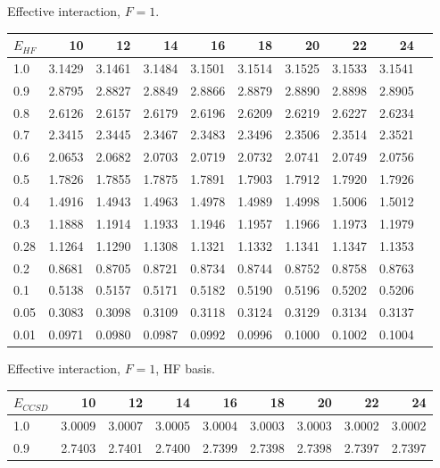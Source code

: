  
\begin{landscape}
\begin{table}
\begin{center}
Effective interaction, $F=1$.\\
\begin{tabular}{l|rrrrrrrrr}
\hline 
$E_{HF}$ & 10 & 12 & 14 & 16 & 18 & 20 & 22 & 24\\ 
\hline \hline
1.0 & 3.1429 & 3.1461 & 3.1484 & 3.1501 & 3.1514 & 3.1525 & 3.1533 & 3.1541  \\ 
0.9 & 2.8795 & 2.8827 & 2.8849 & 2.8866 & 2.8879 & 2.8890 & 2.8898 & 2.8905  \\ 
0.8 & 2.6126 & 2.6157 & 2.6179 & 2.6196 & 2.6209 & 2.6219 & 2.6227 & 2.6234  \\ 
0.7 & 2.3415 & 2.3445 & 2.3467 & 2.3483 & 2.3496 & 2.3506 & 2.3514 & 2.3521  \\ 
0.6 & 2.0653 & 2.0682 & 2.0703 & 2.0719 & 2.0732 & 2.0741 & 2.0749 & 2.0756  \\ 
0.5 & 1.7826 & 1.7855 & 1.7875 & 1.7891 & 1.7903 & 1.7912 & 1.7920 & 1.7926  \\ 
0.4 & 1.4916 & 1.4943 & 1.4963 & 1.4978 & 1.4989 & 1.4998 & 1.5006 & 1.5012  \\ 
0.3 & 1.1888 & 1.1914 & 1.1933 & 1.1946 & 1.1957 & 1.1966 & 1.1973 & 1.1979  \\ 
0.28 & 1.1264 & 1.1290 & 1.1308 & 1.1321 & 1.1332 & 1.1341 & 1.1347 & 1.1353 \\ 
0.2 & 0.8681 & 0.8705 & 0.8721 & 0.8734 & 0.8744 & 0.8752 & 0.8758 & 0.8763  \\ 
0.1 & 0.5138 & 0.5157 & 0.5171 & 0.5182 & 0.5190 & 0.5196 & 0.5202 & 0.5206  \\ 
0.05 & 0.3083 & 0.3098 & 0.3109 & 0.3118 & 0.3124 & 0.3129 & 0.3134 & 0.3137 \\ 
0.01 & 0.0971 & 0.0980 & 0.0987 & 0.0992 & 0.0996 & 0.1000 & 0.1002 & 0.1004 \\ 
\hline \hline
\end{tabular} 
\end{center}
\begin{center}
Effective interaction, $F=1$, HF basis.\\
\begin{tabular}{l|rrrrrrrr}
\hline 
$E_{CCSD}$ & 10 & 12 & 14 & 16 & 18 & 20 & 22 & 24\\
\hline \hline
1.0 & 3.0009 & 3.0007 & 3.0005 & 3.0004 & 3.0003 & 3.0003 & 3.0002 & 3.0002  \\ 
0.9 & 2.7403 & 2.7401 & 2.7400 & 2.7399 & 2.7398 & 2.7398 & 2.7397 & 2.7397  \\ 

\end{tabular}
\end{center}
\end{table}
\end{landscape}
